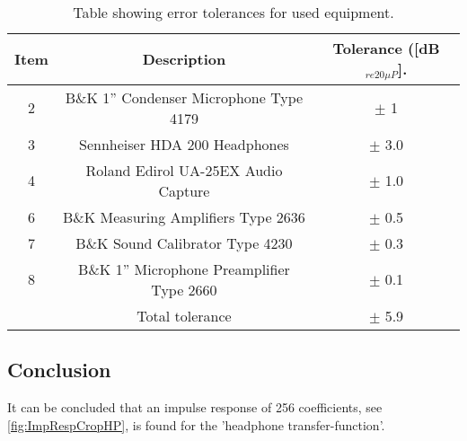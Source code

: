 \begin{table}[H]
	\centering
	\begin{tabular}{ c c c } \toprule
	{Item}	& 		{Description} 							& {Tolerance ([dB$_{re20\mu P}$]}.\\ \bottomrule 
		2	&	B\&K 1'' Condenser Microphone Type 4179 	& $\pm$ 1		\\
		3	&	Sennheiser HDA 200 Headphones				& $\pm$ 3.0		\\
		4	&	Roland Edirol UA-25EX Audio Capture			& $\pm$ 1.0		\\
		6	&	B\&K Measuring Amplifiers Type 2636			& $\pm$ 0.5		\\
		7	&	B\&K Sound Calibrator Type 4230				& $\pm$ 0.3		\\ 
		8	&	B\&K 1'' Microphone Preamplifier Type 2660	& $\pm$ 0.1		\\ \bottomrule
			&	Total tolerance								& $\pm$ 5.9		\\ \bottomrule	
	\end{tabular}
	\caption{Table showing error tolerances for used equipment.}
	\label{TolerancesHP}
\end{table}

\subsection{Conclusion}
It can be concluded that an impulse response of 256 coefficients, see \autoref{fig:ImpRespCropHP}, is found for the 'headphone transfer-function'.